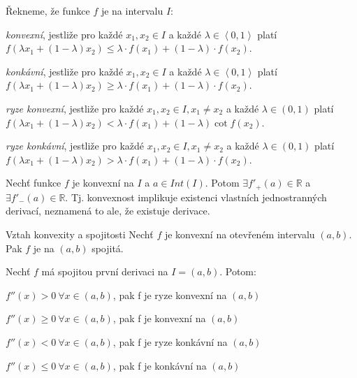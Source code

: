 \begin{definice} %
Řekneme, že funkce $f$ je na intervalu $I$:
\begin{pitemize}
	\item \emph{konvexní}, jestliže pro každé $x_1, x_2 \in I$ a každé $\lambda \in \left<0, 1\right>$ platí\\$f(\lambda x_1 + (1-\lambda)x_2) \le \lambda \cdot f(x_1)+(1-\lambda)\cdot f(x_2)$.
	\item \emph{konkávní}, jestliže pro každé $x_1, x_2 \in I$ a každé $\lambda \in \left<0, 1\right>$ platí\\$f(\lambda x_1 + (1-\lambda)x_2) \ge \lambda \cdot f(x_1)+(1-\lambda)\cdot f(x_2)$.
	\item \emph{ryze konvexní}, jestliže pro každé $x_1, x_2 \in I, x_1 \neq x_2$ a každé $\lambda \in (0, 1)$ platí\\$f(\lambda x_1 + (1-\lambda)x_2) < \lambda \cdot f(x_1)+(1-\lambda)\cot f(x_2)$.
	\item \emph{ryze konkávní}, jestliže pro každé $x_1, x_2 \in I, x_1 \neq x_2$ a každé $\lambda \in (0, 1)$ platí\\$f(\lambda x_1 + (1-\lambda)x_2) > \lambda \cdot f(x_1)+(1-\lambda)\cdot f(x_2)$.
\end{pitemize}
\end{definice}

\begin{veta}
Nechť funkce $f$ je konvexní na $I$ a $a \in Int(I)$. Potom $\exists f'_+(a) \in \mathbb{R}$ a $\exists f'_-(a) \in \mathbb{R}$. Tj. konvexnost implikuje existenci vlastních jednostranných derivací, neznamená to ale, že existuje derivace.
\end{veta}

\begin{vetaN}{Vztah konvexity a spojitosti}
Nechť $f$ je konvexní na otevřeném intervalu $(a, b)$. Pak $f$ je na $(a, b)$ spojitá.
\end{vetaN}

\begin{veta}
Nechť $f$ má spojitou první derivaci na $I=(a, b)$. Potom:
\begin{pitemize}
	\item $f''(x)>0\ \forall x \in (a, b)$, pak f je ryze konvexní na $(a, b)$
	\item $f''(x) \ge 0\ \forall x \in (a, b)$, pak f je konvexní na $(a, b)$
	\item $f''(x)<0\ \forall x \in (a, b)$, pak f je ryze konkávní na $(a, b)$
	\item $f''(x) \le 0\ \forall x \in (a, b)$, pak f je konkávní na $(a, b)$
\end{pitemize}
\end{veta}

